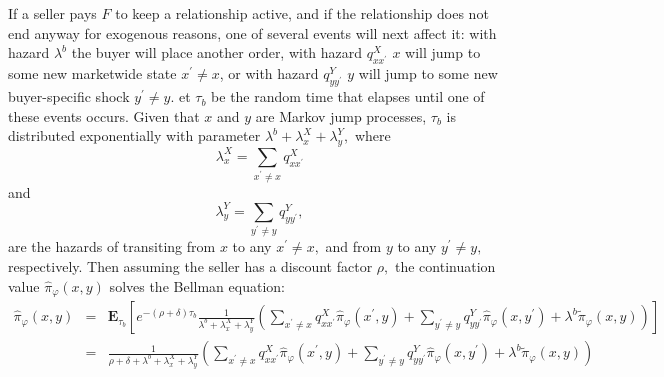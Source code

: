 \setcounter{footnote}{0}

If a seller pays $F$ to keep a relationship active, and if the relationship
does not end anyway for exogenous reasons, one of several events will next
affect it: with hazard $\lambda ^{b}$ the buyer will place another order,
with hazard $q_{xx^{\prime }}^{X}$ $x$ will jump to some new marketwide
state $x^{\prime }\neq x$, or with hazard $q_{yy^{\prime }}^{Y}$ $y$ will
jump to some new buyer-specific shock $y^{\prime }\neq y$.\footnotemark{} et $\tau _{b}$ be
the random time that elapses until one of these events occurs. Given that $x$
and $y$ are Markov jump processes, $\tau _{b}$ is distributed exponentially
with parameter $\lambda ^{b}+\lambda _{x}^{X}+\lambda _{y}^{Y}, $ where%
\begin{equation}
\lambda _{x}^{X}=\sum_{x^{\prime }\neq x}q_{xx^{\prime }}^{X}  \label{q_K}
\end{equation}%
and%
\begin{equation}
\lambda _{y}^{Y}=\sum_{y^{\prime }\neq y}q_{yy^{\prime }}^{Y},  \label{q_Y}
\end{equation}%
are the hazards of transiting from $x$ to any $x^{\prime }\neq x,$ and from $%
y$ to any $y^{\prime }\neq y,$ respectively. Then assuming the seller has a
discount factor $\rho ,$ the continuation value $\widehat{\pi }_{\varphi
}(x,y)$ solves the Bellman equation:%
\begin{eqnarray*}
\widehat{\pi }_{\varphi }(x,y) &=&\mathbf{E}_{\tau _{b}}\left[ e^{-(\rho
+\delta )\tau _{b}}\frac{1}{\lambda ^{b}+\lambda _{x}^{X}+\lambda _{y}^{Y}}%
\left( \sum_{x^{\prime }\neq x}q_{xx^{\prime }}^{X}\widehat{\pi }_{\varphi
}(x^{\prime },y)+\sum_{y^{\prime }\neq y}q_{yy^{\prime }}^{Y}\widehat{\pi }%
_{\varphi }(x,y^{\prime })+\lambda ^{b}\widetilde{\pi }_{\varphi
}(x,y)\right) \right] \\
&=&\frac{1}{\rho +\delta +\lambda ^{b}+\lambda _{x}^{X}+\lambda _{y}^{Y}}%
\left( \sum_{x^{\prime }\neq x}q_{xx^{\prime }}^{X}\widehat{\pi }_{\varphi
}(x^{\prime },y)+\sum_{y^{\prime }\neq y}q_{yy^{\prime }}^{Y}\widehat{\pi }%
_{\varphi }(x,y^{\prime })+\lambda ^{b}\widetilde{\pi }_{\varphi
}(x,y)\right)
\end{eqnarray*}

